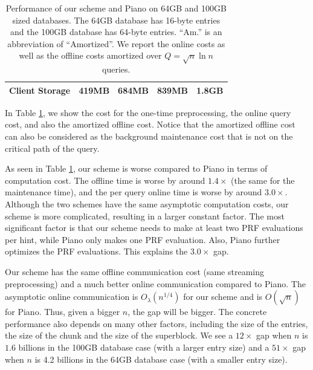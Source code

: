 \begin{table}[ht]
\begin{centering}
\begin{tabular}{ ccccc}
            Client Storage & \cellcolor{green!35}  419MB & \cellcolor{red!35} 684MB  & \cellcolor{green!35} 839MB &\cellcolor{red!35} 1.8GB \\
            \bottomrule
        \end{tabular}
        \caption{Performance of our scheme and Piano on 64GB and 100GB sized databases.
        The 64GB database has 16-byte entries and the 100GB database has 64-byte entries. 
``Am.'' is an abbreviation of ``Amortized''. We report the online costs as well as the offline costs amortized over $Q=\sqrt{n}\ln n$ queries.
}
        \label{table:piano_comparison_table}
    \end{centering}
\end{table}

In Table \ref{table:piano_comparison_table}, we show the cost for the one-time preprocessing, the online query cost, and also the amortized offline cost. 
Notice that the amortized offline cost can also be considered as the background maintenance cost that is not on the critical path of the query.

As seen in Table \ref{table:piano_comparison_table}, our scheme is worse compared to Piano in terms of computation cost.
The offline time is worse by around $1.4\times$ (the same for the maintenance time), and the per query online time is worse by around $3.0\times$. 
Although the two schemes have the same asymptotic computation costs, our scheme is more complicated, resulting in a larger constant factor.
The most significant factor is that our scheme needs to make at least two PRF evaluations per hint, while Piano only makes one PRF evaluation. 
Also, Piano further optimizes the PRF evaluations.
This explains the $3.0\times$ gap. 



Our scheme has the same offline communication cost (same streaming preprocessing) and a much better online communication compared to Piano. 
The asymptotic online communication  is $O_\lambda(n^{1/4})$ for our scheme and is $O(\sqrt{n})$ for Piano.
Thus, given a bigger $n$, the gap will be bigger.
The concrete performance also depends on many other factors, including the size of the entries, the size of the chunk and the size of the superblock.
We see a $12\times$ gap when $n$ is $1.6$ billions in the 100GB database case (with a larger entry size) and a $51\times$ gap when $n$ is 4.2 billions in the 64GB database case (with a smaller entry size).

